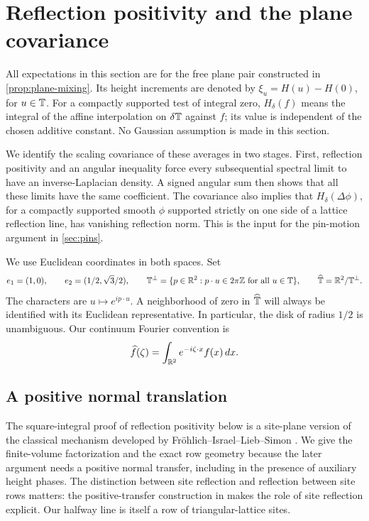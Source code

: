 \section{Reflection positivity and the plane covariance}
\label{sec:spectral}

All expectations in this section are for the free plane pair constructed in
\cref{prop:plane-mixing}. Its height increments are denoted by
\(\xi_u=H(u)-H(0)\), for \(u\in\mathbb T\). For a compactly supported test of integral
zero, \(H_\delta(f)\) means the integral of the affine interpolation on
\(\delta\mathbb T\) against \(f\); its value is independent of the chosen additive
constant. No Gaussian assumption is made in this section.

We identify the scaling covariance of these averages in two stages. First,
reflection positivity and an angular inequality force every subsequential
spectral limit to have an inverse-Laplacian density. A signed angular sum
then shows that all these limits have the same coefficient. The covariance
also implies that \(H_\delta(\Delta\phi)\), for a compactly supported smooth
\(\phi\) supported strictly on one side of a lattice reflection line, has
vanishing reflection norm.
This is the input for the pin-motion argument in \cref{sec:pins}.

We use Euclidean coordinates in both spaces. Set
\[
 e_1=(1,0),\qquad e_2=(1/2,\sqrt3/2),\qquad
 \mathbb T^\perp=\{p\in\mathbb R^2:p\cdot u\in2\pi\mathbb Z\text{ for all }u\in\mathbb T\},
 \qquad \widehat{\mathbb T}=\mathbb R^2/\mathbb T^\perp.
\]
The characters are \(u\mapsto e^{ip\cdot u}\). A neighborhood of zero in
\(\widehat{\mathbb T}\) will always be identified with its Euclidean representative.
In particular, the disk of radius \(1/2\) is unambiguous. Our continuum Fourier
convention is
\[
 \widehat f(\zeta)=\int_{\mathbb R^2}e^{-i\zeta\cdot x}f(x)\,dx.
\]

\subsection{A positive normal translation}

The square-integral proof of reflection positivity below is a site-plane
version of the classical mechanism developed by
Fr\"ohlich--Israel--Lieb--Simon \cite{FILS1978}.  We give the finite-volume
factorization and the exact row geometry because the later argument needs
a positive normal transfer, including in the presence of auxiliary
height phases.
The distinction between site reflection and reflection between site rows
matters: the positive-transfer construction in
\cite[Sections~3.3 and 4.1]{Usui2012} makes the role of site reflection
explicit.  Our halfway line is itself a row of triangular-lattice sites.

